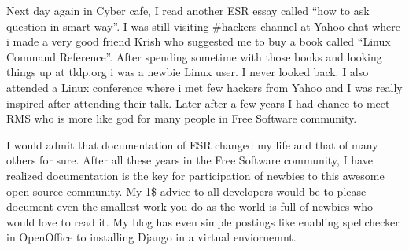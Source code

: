 Next day again in Cyber cafe, I read another ESR essay called “how to
ask question in smart way”. I was still visiting \#hackers channel at
Yahoo chat where i made a very good friend Krish who suggested me to
buy a book called “Linux Command Reference”.  After spending sometime
with those books and looking things up at tldp.org i was a newbie
Linux user. I never looked back. I also attended a Linux conference
where i met few hackers from Yahoo and I was really inspired after
attending their talk. Later after a few years I had chance to meet RMS
who is more like god for many people in Free Software community.

I would admit that documentation of ESR changed my life and that of
many others for sure. After all these years in the Free Software
community, I have realized documentation is the key for participation
of newbies to this awesome open source community. My 1\$ advice to all
developers would be to please document even the smallest work you do as the world
is full of newbies who would love to read it. My blog has even simple
postings like enabling spellchecker in OpenOffice to installing Django
in a virtual enviornemnt.
